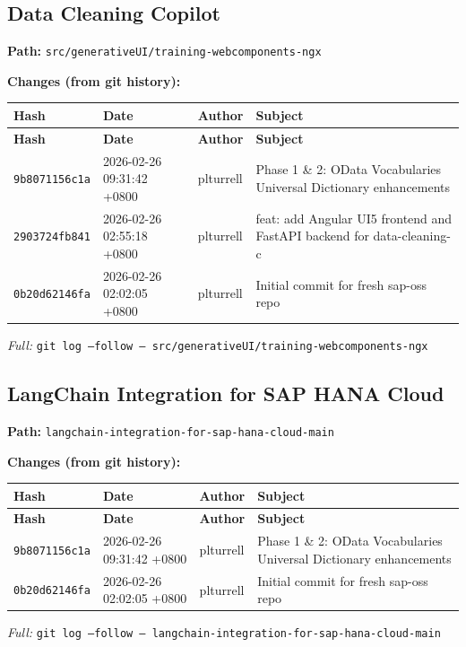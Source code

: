 \documentclass[11pt,a4paper]{article}
\begin{document}
\subsection{Data Cleaning Copilot}
\textbf{Path:} \texttt{src/generativeUI/training-webcomponents-ngx}

\textbf{Changes (from git history):}
\begin{longtable}{|p{2.2cm}|p{3.2cm}|l|p{6cm}|}
\hline \textbf{Hash} & \textbf{Date} & \textbf{Author} & \textbf{Subject} \\ \hline \endfirsthead
\hline \textbf{Hash} & \textbf{Date} & \textbf{Author} & \textbf{Subject} \\ \hline \endhead
\texttt{9b8071156c1a} & 2026-02-26 09:31:42 +0800 & plturrell & Phase 1 \& 2: OData Vocabularies Universal Dictionary enhancements \\
\texttt{2903724fb841} & 2026-02-26 02:55:18 +0800 & plturrell & feat: add Angular UI5 frontend and FastAPI backend for data-cleaning-c \\
\texttt{0b20d62146fa} & 2026-02-26 02:02:05 +0800 & plturrell & Initial commit for fresh sap-oss repo \\
\hline
\end{longtable}
\textit{Full:} \texttt{git log --follow -- src/generativeUI/training-webcomponents-ngx}

\subsection{LangChain Integration for SAP HANA Cloud}
\textbf{Path:} \texttt{langchain-integration-for-sap-hana-cloud-main}

\textbf{Changes (from git history):}
\begin{longtable}{|p{2.2cm}|p{3.2cm}|l|p{6cm}|}
\hline \textbf{Hash} & \textbf{Date} & \textbf{Author} & \textbf{Subject} \\ \hline \endfirsthead
\hline \textbf{Hash} & \textbf{Date} & \textbf{Author} & \textbf{Subject} \\ \hline \endhead
\texttt{9b8071156c1a} & 2026-02-26 09:31:42 +0800 & plturrell & Phase 1 \& 2: OData Vocabularies Universal Dictionary enhancements \\
\texttt{0b20d62146fa} & 2026-02-26 02:02:05 +0800 & plturrell & Initial commit for fresh sap-oss repo \\
\hline
\end{longtable}
\textit{Full:} \texttt{git log --follow -- langchain-integration-for-sap-hana-cloud-main}
\end{document}
